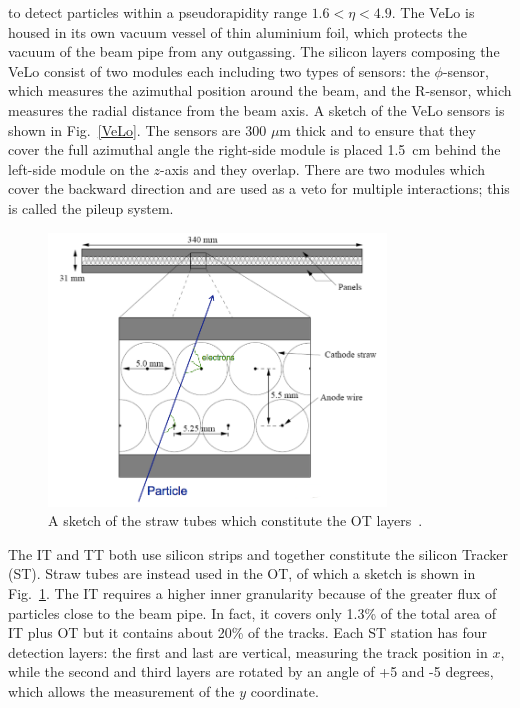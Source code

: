 to detect particles within a pseudorapidity range $1.6 < \eta < 4.9$. The VeLo is housed in its own
vacuum vessel of thin aluminium foil, which protects the vacuum of the beam pipe from any outgassing. 
The silicon layers composing the VeLo consist of two modules each including two types of sensors:
the $\phi$-sensor, which measures the azimuthal position around the beam, and the R-sensor, which measures
the radial distance from the beam axis. A sketch of the VeLo sensors is shown in Fig.~\ref{VeLo}. The sensors
are 300 $\mu$m thick and to ensure that they cover the full azimuthal angle the right-side module is placed
1.5~cm behind the left-side module on the $z$-axis and they overlap. There are two modules which cover the
backward direction and are used as a veto for multiple interactions; this is called the pileup system.
%
\begin{center}
\begin{figure}[h!]
\centering 
\includegraphics[width=0.8\textwidth]{Detector/figs/straw_tubes.png}
\caption{A sketch of the straw tubes which constitute the OT layers~\cite{Alves:2008zz}.}
\label{fig:straw:tubes}
\end{figure}
\end{center}
%
The IT and TT both use silicon strips and together constitute the silicon Tracker (ST). Straw tubes are instead used 
in the OT, of which a sketch is shown in Fig.~\ref{fig:straw:tubes}. The IT requires a higher inner granularity
because of the greater flux of particles close to the beam pipe. In fact, it covers only 1.3\% of the total
area of IT plus OT but it contains about 20\% of the tracks. Each ST station has four detection layers:
the first and last are vertical, measuring the track position in $x$, while the second 
and third layers are rotated by an angle of +5 and -5 degrees, which allows the measurement of the $y$ coordinate. 
